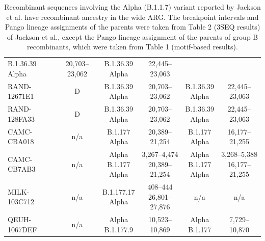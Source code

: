 \documentclass{article}
\begin{document}
\begin{table}
\begin{tabular}{l|c|c|c|c|c}
\thead{B.1.36.39 \\ Alpha} & 20,703–23,062 & \thead{B.1.36.39 \\ Alpha} &
22,445–23,063 \\ RAND-12671E1 & D & \thead{B.1.36.39 \\ Alpha} & 20,703–23,062
& \thead{B.1.36.39 \\ Alpha} & 22,445–23,063 \\ RAND-128FA33 & D &
\thead{B.1.36.39 \\ Alpha} & 20,703–23,062 & \thead{B.1.36.39 \\ Alpha} &
22,445–23,063 \\ CAMC-CBA018 & n/a & \thead{B.1.177 \\ Alpha} & 20,389–21,254 &
\thead{B.1.177 \\ Alpha} & 16,177–21,255 \\ CAMC-CB7AB3 & n/a & \thead{Alpha \\
B.1.177 \\ Alpha} & \thead{3,267–4,474 \\ 20,389–21,254} & \thead{Alpha \\
B.1.177 \\ Alpha} & \thead{3,268–5,388 \\ 16,177–21,255} \\ MILK-103C712 & n/a
& \thead{B.1.177.17 \\ Alpha} & \thead{408–444 \\ 26,801–27,876} & n/a & n/a \\
QEUH-1067DEF & n/a & \thead{Alpha \\ B.1.177.9} & 10,523–10,869 & \thead{Alpha
\\ B.1.177} & 7,729–10,870 \\ \hline \end{tabular}
\caption{\label{tab:jackson}Recombinant sequences involving the Alpha (B.1.1.7)
variant reported by Jackson et al. \cite{Jackson2021-ik} have recombinant
ancestry in the wide ARG. The breakpoint intervals and Pango lineage
assignments of the parents were taken from Table 2 (3SEQ results) of Jackson et
al., except the Pango lineage assignment of the parents of group B
recombinants, which were taken from Table 1 (motif-based results).} \end{table}
\end{document}
